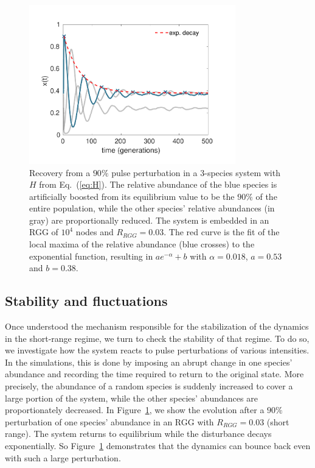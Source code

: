 \begin{figure}[t!]
 \centering
 \includegraphics[width=0.8\textwidth]{figures/chp1/fig6.pdf}
  \caption[Time evolution of the recovery from a pulse perturbation]{Recovery from a $90 \%$ pulse perturbation in a 3-species system with $H$ from Eq.~(\ref{eq:H}). The relative abundance of the blue species is artificially boosted from its equilibrium value to be the $90 \%$ of the entire population, while the  other species' relative abundances (in gray) are proportionally reduced. The system is embedded in an RGG of $10^4$ nodes and $R_{RGG} = 0.03$. The red curve is the fit of the local maxima of the relative abundance (blue crosses) to the exponential function, resulting in $a e^{-\alpha} + b$ with $\alpha = 0.018$, $a = 0.53$ and $b = 0.38$.}
    \label{chp1:fig:6}
\end{figure}

\subsection{\label{chp1:2.4}Stability and fluctuations}

Once understood the mechanism responsible for the stabilization of the dynamics in the short-range regime, we turn to check
the stability of that regime. To do so, we investigate how the system reacts to pulse perturbations of various intensities. In the simulations, this is done by imposing an abrupt change in one species' abundance and recording the time required to return to the original state. More precisely, the abundance of a random species is suddenly increased to cover a large portion of the system, while the other species' abundances are proportionately decreased. In Figure~\ref{chp1:fig:6}, we show the evolution 
after a $90 \%$ perturbation of one species'  abundance in an RGG with $R_{RGG}=0.03$ (short range). The system returns to equilibrium while the disturbance decays exponentially. So Figure~\ref{chp1:fig:6} demonstrates that the dynamics can bounce back even with such a large perturbation. \\

